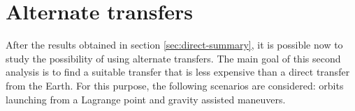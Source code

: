 \chapter{Alternate transfers}

After the results obtained in section \ref{sec:direct-summary}, it is possible
now to study the possibility of using alternate transfers. The main goal of this
second analysis is to find a suitable transfer that is less expensive than a
direct transfer from the Earth. For this purpose, the following scenarios are
considered: orbits launching from a Lagrange point and gravity assisted
maneuvers.





